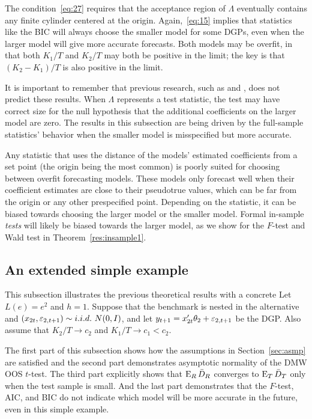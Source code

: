 \documentclass[12pt]{article}
\begin{document}
The condition~\ref{eq:27} requires that the acceptance region of
$\Lambda$ eventually contains any finite cylinder centered at the
origin. Again,~\eqref{eq:15} implies that statistics like the BIC
will always choose the smaller model for some DGPs, even when the
larger model will give more accurate forecasts. Both models may be
overfit, in that both $K_1/T$ and $K_2/T$ may both be positive in the
limit; the key is that $(K_2 - K_1)/T$ is also positive in the limit.

It is important to remember that previous research, such as
\citet{Cal:11c} and \citet{Ana:12}, does not predict these
results. When $\Lambda$ represents a test statistic, the test may have
correct size for the null hypothesis that the additional coefficients
on the larger model are zero. The results in this subsection are being
driven by the full-sample statistics' behavior when the smaller model
is misspecified but more accurate.

Any statistic that uses the distance of the models' estimated
coefficients from a set point (the origin being the most common) is
poorly suited for choosing between overfit forecasting models. These
models only forecast well when their coefficient estimates are close
to their pseudotrue values, which can be far from the origin or any
other prespecified
point. Depending on the statistic, it can be biased towards choosing
the larger model or the smaller model. Formal in-sample \emph{tests}
will likely be biased towards the larger model, as we show for the
$F$-test and Wald test in Theorem~\ref{res:insample1}.

\subsection{An extended simple example}
\label{sec:example}

This subsection illustrates the previous theoretical results with a
concrete Let $L(e) = e^2$ and $h = 1$. Suppose that the benchmark is
nested in the alternative and $(x_{2t}, \varepsilon_{2,t+1}) \sim i.i.d.\
N(0,I)$, and let $y_{t+1} = x_{2t}'\theta_2 + \varepsilon_{2,t+1}$
be the DGP. Also assume that $K_2/T \to c_2$ and $K_1 / T \to c_1 <
c_2$.

The first part of this subsection shows how the assumptions in
Section~\ref{sec:asmp} are satisfied and the second part
demonstrates asymptotic normality of the DMW OOS $t$-test. The third
part explicitly shows that $\operatorname{E}_R \bar{D}_{R}$ converges to $\operatorname{E}_T \bar{D}_{T}$ only
when the test sample is small. And the last part demonstrates that the
$F$-test, AIC, and BIC do not indicate which model will be more
accurate in the future, even in this simple example.
\end{document}

